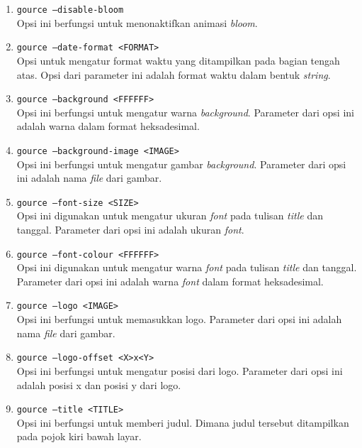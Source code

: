 \begin{enumerate}
\item \texttt{gource --disable-bloom}\\
Opsi ini berfungsi untuk menonaktifkan animasi \textit{bloom}.

\item \texttt{gource --date-format <FORMAT>}\\ 
Opsi untuk mengatur format waktu yang ditampilkan pada bagian tengah atas. Opsi dari parameter ini adalah format waktu dalam bentuk \textit{string}.

\item \texttt{gource --background <FFFFFF>}\\
Opsi ini berfungsi untuk mengatur warna \textit{background}. Parameter dari opsi ini adalah warna dalam format heksadesimal.

\item \texttt{gource --background-image <IMAGE>}\\
Opsi ini berfungsi untuk mengatur gambar \textit{background}. Parameter dari opsi ini adalah nama \textit{file} dari gambar.

\item \texttt{gource --font-size <SIZE>}\\
Opsi ini digunakan untuk mengatur ukuran \textit{font} pada tulisan \textit{title} dan tanggal. Parameter dari opsi ini adalah ukuran \textit{font}.  

\item \texttt{gource --font-colour <FFFFFF>}\\
Opsi ini digunakan untuk mengatur warna \textit{font} pada tulisan \textit{title} dan tanggal. Parameter dari opsi ini adalah warna \textit{font} dalam format heksadesimal.

\item \texttt{gource --logo <IMAGE>}\\
Opsi ini berfungsi untuk memasukkan logo. Parameter dari opsi ini adalah nama \textit{file} dari gambar.

\item \texttt{gource --logo-offset <X>x<Y>}\\
Opsi ini berfungsi untuk mengatur posisi dari logo. Parameter dari opsi ini adalah posisi x dan posisi y dari logo. 

\item \texttt{gource --title <TITLE>}\\
Opsi ini berfungsi untuk memberi judul. Dimana judul tersebut ditampilkan pada pojok kiri bawah layar. 


\end{enumerate}
